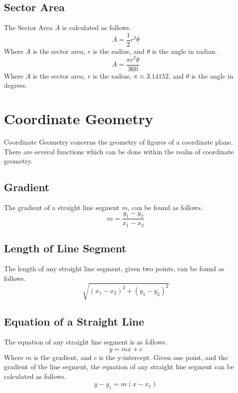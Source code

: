 \documentclass{report}
\begin{document}
\begin{flushleft}
\subsection{Sector Area}
The Sector Area $A$ is calculated as follows.
\begin{equation}
A=\frac{1}{2}r^2\theta
\end{equation}
Where $A$ is the sector area, $r$ is the radius, and $\theta$ is the angle in radian.
\begin{equation}
A=\frac{\pi r^2 \theta}{360}
\end{equation}
Where $A$ is the sector area, $r$ is the radius, $\pi \approx 3.14152$, and $\theta$ is the angle in degrees.

\section{Coordinate Geometry}
Coordinate Geometry concerns the geometry of figures of a coordinate plane. There are several functions which can be done within the realm of coordinate geometry. 

\subsection{Gradient}
The gradient of a straight line segment $m$, can be found as follows.
\begin{equation}
m=\frac{y_1-y_2}{x_1-x_2}
\end{equation}

\subsection{Length of Line Segment}
The length of any straight line segment, given two points, can be found as follows.
\begin{equation}
\sqrt{\left(x_1-x_2\right)^2+\left(y_1-y_2\right)^2}
\end{equation}

\subsection{Equation of a Straight Line}
The equation of any straight line segment is as follows.
\begin{equation}
y=mx+c
\end{equation}
Where $m$ is the gradient, and $c$ is the y-intercept.
\newline
\newline
Given one point, and the gradient of the line segment, the equation of any straight line segment can be calculated as follows.
\begin{equation}
y-y_1 = m\left(x-x_1\right)
\end{equation}


\end{flushleft}
\end{document}

